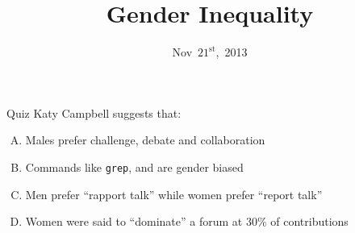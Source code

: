 \documentclass{beamer}
\title{Gender Inequality}
\date{Nov~$21^{\text{st}}$,~2013}
\begin{document}
\begin{frame}
\titlepage
\end{frame}

\begin{frame}{Quiz}
Katy Campbell suggests that:
\begin{enumerate}[(A)]
\item<1> Males prefer challenge, debate and collaboration %
\item<1> Commands like \texttt{grep},  and  are gender biased %
\item<1> Men prefer ``rapport talk'' while women prefer ``report talk'' %
\item<1-2> Women were said to ``dominate'' a forum at 30\% of contributions
\end{enumerate}
\end{frame}

\end{document}
